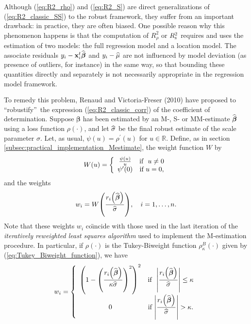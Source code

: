 Although (\ref{eq:R2_rho}) and (\ref{eq:R2_S}) are direct generalizations of
(\ref{eq:R2_classic_SS}) to the robust framework, they suffer from an
important drawback: in practice, they are often biased. One possible reason
why this phenomenon happens is that the computation of $R_{\rho}^{2}$ or
$R_{\stsc{S}}^{2}$ requires and uses the estimation of two models: the full
regression model and a location model. The associate residuals $y_{i}%
-\stvec{x}_{i}^{t}\sthat{\boldsymbol\beta}$ and $y_{i}-\widehat{\mu}$ are
not influenced by model deviation (as presence of outliers, for instance) in
the same way, so that bounding these quantities directly and separately is not
necessarily appropriate in the regression model framework.

To remedy this problem, Renaud and Victoria-Freser (2010) have proposed to
\textquotedblleft robustify\textquotedblright\ the expression
(\ref{eq:R2_classic_corr}) of the coefficient of determination. Suppose
$\boldsymbol\beta$ has been estimated by an M-, S- or MM-estimate
$\widehat{\boldsymbol\beta}$ using a loss function $\rho\left(
\cdot\right)  $, and let $\widehat{\sigma}$ be the final robust estimate of
the scale parameter $\sigma$. Let, as usual, $\psi\left(  u\right)
=\rho^{\prime}\left(  u\right)  $ for $u\in\mathbb{R}$. Define, as in section
\ref{subsec:practical_implementation_Mestimate}, the weight function $W$ by
\[
W\left(  u\right)  =\left\{
\begin{array}
[c]{cc}%
\frac{\psi\left(  u\right)  }{u} & \text{if \ }u\neq0\\
\psi^{\prime}\left(  0\right)  & \text{if }u=0,
\end{array}
\right.
\]
and the weights
\[
w_{i}=W\left(  \frac{r_{i}\left(  \sthat{\boldsymbol\beta}\right)
}{\sthat{\sigma}}\right)  ,\quad i = 1, \dots, n.
\]
Note that these weights $w_{i}$ co\"{\i}ncide with those used in the last
iteration of the \emph{iteratively reweighted least squares algorithm} used
to implement the M-estimation procedure. In particular, if $\rho\left(
\cdot\right)  $ is the Tukey-Biweight function $\rho_{\kappa}^{B}\left(
\cdot\right)  $ given by (\ref{eq:Tukey_Biweight_function}), we have
\[
w_{i}=\left\{
\begin{array}
[c]{cc}%
\left(  1-\left(  \dfrac{r_{i}\left(  \sthat{\boldsymbol\beta}\right)
}{\kappa\sthat{\sigma}}\right)  ^{2}\right)  ^{2} & \text{if \ }\left\vert
\dfrac{r_{i}\left(  \sthat{\boldsymbol\beta}\right)  }{\sthat{\sigma}%
}\right\vert \leq\kappa\\
0 & \text{if }\left\vert \dfrac{r_{i}\left(  \sthat{\boldsymbol\beta%
}\right)  }{\sthat{\sigma}}\right\vert >\kappa.
\end{array}
\right.
\]
